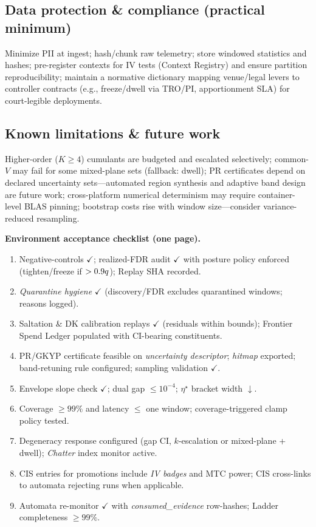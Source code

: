 \subsection*{Data protection \& compliance (practical minimum)}
Minimize PII at ingest; hash/chunk raw telemetry; store windowed statistics and hashes; pre-register contexts for IV tests (Context Registry) and ensure partition reproducibility; maintain a normative dictionary mapping venue/legal levers to controller contracts (e.g., freeze/dwell via TRO/PI, apportionment SLA) for court-legible deployments.

\subsection*{Known limitations \& future work}
Higher-order ($K{\ge}4$) cumulants are budgeted and escalated selectively; common-$V$ may fail for some mixed-plane sets (fallback: dwell); PR certificates depend on declared uncertainty sets—automated region synthesis and adaptive band design are future work; cross-platform numerical determinism may require container-level BLAS pinning; bootstrap costs rise with window size—consider variance-reduced resampling.

\begin{mdframed}
\textbf{Environment acceptance checklist (one page).}
\begin{enumerate}[leftmargin=*]
\item Negative-controls $\checkmark$; realized-FDR audit $\checkmark$ with posture policy enforced (tighten/freeze if $>0.9q$); Replay SHA recorded.
\item \emph{Quarantine hygiene} $\checkmark$ (discovery/FDR excludes quarantined windows; reasons logged).
\item Saltation \& DK calibration replays $\checkmark$ (residuals within bounds); Frontier Spend Ledger populated with CI-bearing constituents.
\item PR/GKYP certificate feasible on \emph{uncertainty descriptor}; \emph{hitmap} exported; band-retuning rule configured; sampling validation $\checkmark$.
\item Envelope slope check $\checkmark$; dual gap $\le 10^{-4}$; $\eta^\star$ bracket width $\downarrow$.
\item Coverage $\ge 99\%$ and latency $\le$ one window; coverage-triggered clamp policy tested.
\item Degeneracy response configured (gap CI, $k$-escalation or mixed-plane + dwell); \emph{Chatter} index monitor active.
\item CIS entries for promotions include \emph{IV badges} and MTC power; CIS cross-links to automata rejecting runs when applicable.
\item Automata re-monitor $\checkmark$ with \emph{consumed\_evidence} row-hashes; Ladder completeness $\ge 99\%$.
\end{enumerate}
\end{mdframed}
